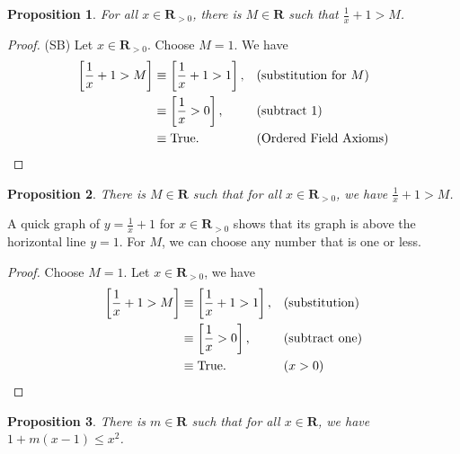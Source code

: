 \documentclass[12pt,fleqn,answers]{article}
\newcommand{\reals}{\mathbf{R}}
\newcommand{\true}{\mathrm{True}}
\newenvironment{myproof}
  {\begin{shaded}\begin{proof}}
  {\end{proof}\end{shaded}}
\newtheorem{prop}{Proposition}
\begin{document}
   


       
    \begin{prop} For all $x \in \reals_{>0}$, there is $M \in \reals$ such
     that $\frac{1}{x} +1 > M$. 
    \end{prop}

    \begin{myproof} (SB)
      Let $x \in \reals_{>0}$. Choose $M = 1$. We have
          \begin{align*}
          \left[\frac{1}{x}+1>M \right] &\equiv \left[\frac{1}{x}+1>1\right], &&\text{(substitution for $M$)} \\
                                  &\equiv \left [\frac{1}{x}>0 \right],
                                  &&\text {(subtract 1)}\\
                                  &\equiv \true. &&\text {(Ordered Field Axioms)} \qedhere
      \end{align*}
\end{myproof}

    \begin{prop}
      There is $M \in \reals$ such that for all $x \in \reals_{>0}$,
     we have $\frac{1}{x} + 1 > M$. 
    \end{prop}
    A quick graph of $ y = \frac{1}{x} + 1 $ for  $x \in \reals_{>0}$ shows that its graph is above the horizontal line $y = 1$. For $M$, 
    we can choose any number that is one or less.
    
    \begin{myproof} Choose $M=1$. Let $x  \in \reals_{>0}$, we have
    \begin{align*}
      \left [ \frac{1}{x} + 1 > M \right] &\equiv    \left [ \frac{1}{x} + 1 > 1 \right], &&(\text{substitution}) \\
                                                               &\equiv    \left [ \frac{1}{x}  > 0 \right], &&(\text{subtract one}) \\
                                                               &\equiv \true.    &&  (x > 0) \qedhere
  \end{align*} 
    
    
    \end{myproof}



        \begin{prop}
      There is $m \in \reals$ such that for all $x \in \reals$, we 
     have $1 + m(x-1) \leq x^2$. 
     \end{prop}
     
\end{document}
